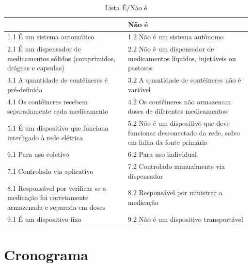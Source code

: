 \begin{apendicesenv}
\begin{table}[H]
    \centering
    \caption{Lista É/Não é}
    \label{tab:lista_e_n_e}
    \begin{tabularx}{\textwidth}{|X|X|}
        \hline
        \rowcolor[HTML]{A8DADC}
        \multicolumn{1}{|X}{\textbf{É}} & \multicolumn{1}{|X|}{\textbf{Não é}} \\ 
        \hline
        1.1 É um sistema automático & 1.2 Não é um sistema autônomo \\ 
        \hline
        2.1 É um dispensador de medicamentos sólidos (comprimidos, drágeas e capsulas) & 2.2 Não é um dispensador de medicamentos líquidos, injetáveis ou pastosos \\ 
        \hline
        3.1 A quantidade de contêineres é pré-definida & 3.2 A quantidade de contêineres não é variável\\ 
        \hline
        4.1 Os contêineres recebem separadamente cada medicamento & 4.2 Os contêineres não armazenam doses de diferentes medicamentos \\
        \hline
        5.1 É um dispositivo que funciona interligado à rede elétrica & 5.2 Não é um dispositivo que deve funcionar desconectado da rede, salvo em falha da fonte primária \\ 
        \hline
        6.1 Para uso coletivo & 6.2 Para uso individual\\ 
        \hline
        7.1 Controlado via aplicativo & 7.2 Controlado manualmente via dispensador\\ 
        \hline
        8.1 Responsável por verificar se a medicação foi corretamente armazenada e separada em doses & 8.2 Responsável por ministrar a medicação\\ 
        \hline
        9.1 É um dispositivo fixo & 9.2 Não é um dispositivo transportável \\ 
        \hline
    \end{tabularx}
\end{table}


\chapter{Cronograma}\label{roadmap}


\end{apendicesenv}
